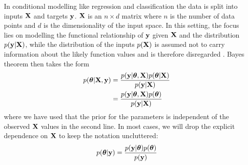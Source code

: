 \documentclass[../thesis.tex]{subfiles}
\begin{document}
In conditional modelling like regression and classification the data is split into inputs $\boldsymbol{\mathbf{X}}$ and targets $\boldsymbol{\mathbf{y}}$. $\boldsymbol{\mathbf{X}}$ is an $n \times d$ matrix where $n$ is the number of data points and $d$ is the dimensionality of the input space. In this setting, the focus lies on modelling the functional relationship of $\boldsymbol{\mathbf{y}}$ given $\boldsymbol{\mathbf{X}}$ and the distribution $p(\boldsymbol{\mathbf{y}} | \boldsymbol{\mathbf{X}})$, while the distribution of the inputs $p(\boldsymbol{\mathbf{X}})$ is assumed not to carry information about the likely function values and is therefore disregarded \parencite[Chapter~14.1]{gelman2014bayesian}. Bayes theorem then takes the form
\begin{equation}
    \begin{split}
        p(\boldsymbol{\mathbf{\theta}} | \boldsymbol{\mathbf{X}}, \boldsymbol{\mathbf{y}}) &= \frac{p(\boldsymbol{\mathbf{y}} | \boldsymbol{\mathbf{\theta}}, \boldsymbol{\mathbf{X}}) p(\boldsymbol{\mathbf{\theta}} | \boldsymbol{\mathbf{X}})}  {p(\boldsymbol{\mathbf{y}} | \boldsymbol{\mathbf{X}})} \\
        &= \frac{p(\boldsymbol{\mathbf{y}} | \boldsymbol{\mathbf{\theta}}, \boldsymbol{\mathbf{X}}) p(\boldsymbol{\mathbf{\theta}})}  {p(\boldsymbol{\mathbf{y}} | \boldsymbol{\mathbf{X}})}
    \end{split}
\end{equation}
where we have used that the prior for the parameters is independent of the observed $\boldsymbol{\mathbf{X}}$ values in the second line. In most cases, we will drop the explicit dependence on $\boldsymbol{\mathbf{X}}$ to keep the notation uncluttered:
\begin{equation}
    \begin{split}
        p(\boldsymbol{\mathbf{\theta}} | \boldsymbol{\mathbf{y}}) = \frac{p(\boldsymbol{\mathbf{y}} | \boldsymbol{\mathbf{\theta}}) p(\boldsymbol{\mathbf{\theta}})}  {p(\boldsymbol{\mathbf{y}})}
    \end{split}
\end{equation}
\end{document}
